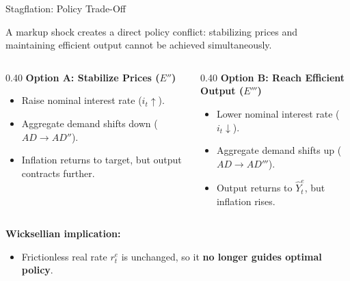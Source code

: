 \documentclass[11pt,aspectratio=169]{beamer}
\begin{document}
\begin{frame}[label=MarkupPolicy]{Stagflation: Policy Trade-Off}
\small

A markup shock creates a direct policy conflict: stabilizing prices and maintaining efficient output cannot be achieved simultaneously.

\vspace{0.2cm}

\begin{columns}[t] %

\begin{column}{0.40\textwidth}
\textbf{Option A: Stabilize Prices ($E''$)}
\begin{itemize}
\item Raise nominal interest rate ($i_t \uparrow$).
\item Aggregate demand shifts down ($AD \rightarrow AD''$).
\item Inflation returns to target, but output contracts further.
\end{itemize}
\end{column}

\begin{column}{0.40\textwidth}
\textbf{Option B: Reach Efficient Output ($E'''$)}
\begin{itemize}
\item Lower nominal interest rate ($i_t \downarrow$).
\item Aggregate demand shifts up ($AD \rightarrow AD'''$).
\item Output returns to $\hat{Y}^e_t$, but inflation rises.
\end{itemize}
\end{column}

\end{columns}

\vspace{0.2cm}

\textbf{Wicksellian implication:}
\begin{itemize}
\item Frictionless real rate $r_t^e$ is unchanged, so it \textbf{no longer guides optimal policy}.
\end{itemize}

\end{frame}
\end{document}
